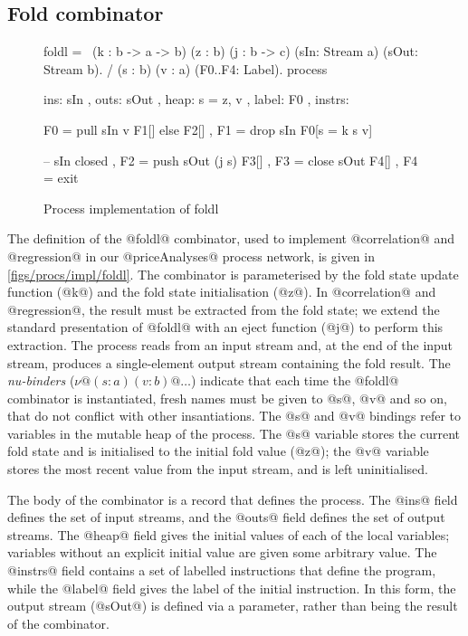 \subsection{Fold combinator}
\begin{figure}
\begin{process}
foldl 
  = \ (k  : b -> a -> b) (z   : b) (j : b -> c)
      (sIn: Stream a)    (sOut: Stream b). 
    / (s  : b) (v : a)   (F0..F4: Label).
    process
     { ins:    { sIn  }
     , outs:   { sOut }
     , heap:   { s = z, v }
     , label:    F0
     , instrs: { F0 = pull  sIn     v  F1[] else F2[]
               , F1 = drop  sIn        F0[s = k s v]

               -- sIn closed
               , F2 = push  sOut (j s) F3[]
               , F3 = close sOut       F4[]
               , F4 = exit } }
\end{process}
\caption{Process implementation of foldl}
\label{figs/procs/impl/foldl}
\end{figure}

The definition of the @foldl@ combinator, used to implement @correlation@ and @regression@ in our @priceAnalyses@ process network, is given in \autoref{figs/procs/impl/foldl}.
The combinator is parameterised by the fold state update function (@k@) and the fold state initialisation (@z@).
In @correlation@ and @regression@, the result must be extracted from the fold state; we extend the standard presentation of @foldl@ with an eject function (@j@) to perform this extraction.
The process reads from an input stream and, at the end of the input stream, produces a single-element output stream containing the fold result.
The \emph{nu-binders} ($\nu@ (s : a) (v : b)@\ldots$) indicate that each time the @foldl@ combinator is instantiated, fresh names must be given to @s@, @v@ and so on, that do not conflict with other insantiations.
The @s@ and @v@ bindings refer to variables in the mutable heap of the process.
The @s@ variable stores the current fold state and is initialised to the initial fold value (@z@); the @v@ variable stores the most recent value from the input stream, and is left uninitialised.

The body of the combinator is a record that defines the process.
The @ins@ field defines the set of input streams, and the @outs@ field defines the set of output streams.
The @heap@ field gives the initial values of each of the local variables; variables without an explicit initial value are given some arbitrary value.
The @instrs@ field contains a set of labelled instructions that define the program, while the @label@ field gives the label of the initial instruction.
In this form, the output stream (@sOut@) is defined via a parameter, rather than being the result of the combinator.

